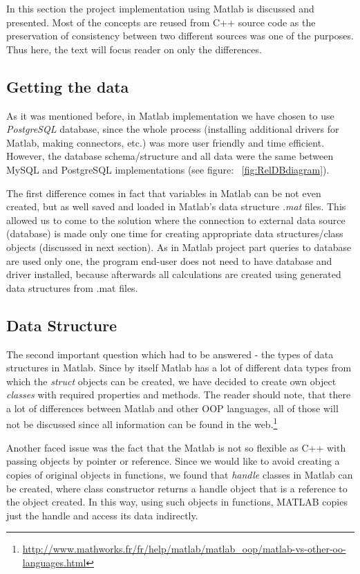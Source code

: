 \documentclass{article}
\begin{document}
In this section the project implementation using Matlab is discussed and presented. Most of the concepts are reused from C++ source code as the preservation of consistency between two different sources was one of the purposes. Thus here, the text will focus reader on only the differences.

\subsection{Getting the data}

As it was mentioned before, in Matlab implementation we have chosen to use \textit{PostgreSQL} database, since the whole process (installing additional drivers for Matlab, making connectors, etc.) was more user friendly and time efficient. However, the database schema/structure and all data were the same between MySQL and PostgreSQL implementations (see figure: ~\ref{fig:RelDBdiagram}).

The first difference comes in fact that variables in Matlab can be not even created, but as well saved and loaded in Matlab's data structure \textit{.mat} files. This allowed us to come to the solution where the connection to external data source (database) is made only one time for creating appropriate data structures/class objects (discussed in next section). As in Matlab project part queries to database are used only one, the program end-user does not need to have database and driver installed, because afterwards all calculations are created using generated data structures from .mat files.

\subsection{Data Structure}

The second important question which had to be answered - the types of data structures in Matlab.
Since by itself Matlab has a lot of different data types from which the \textit{struct} objects can be created, we have decided to create own object \textit{classes} with required properties and methods. The reader should note, that there a lot of differences between Matlab and other OOP languages, all of those will not be discussed since all information can be found in the web.\footnote{
\url{http://www.mathworks.fr/fr/help/matlab/matlab_oop/matlab-vs-other-oo-languages.html}
}

Another faced issue was the fact that the Matlab is not so flexible as C++ with passing objects by pointer or reference. Since we would like to avoid creating a copies of original objects in functions, we found that \textit{handle} classes in Matlab can be created, where class constructor returns a handle object that is a reference to the object created. In this way, using such objects in functions, MATLAB copies just the handle and access its data indirectly.
\end{document}
